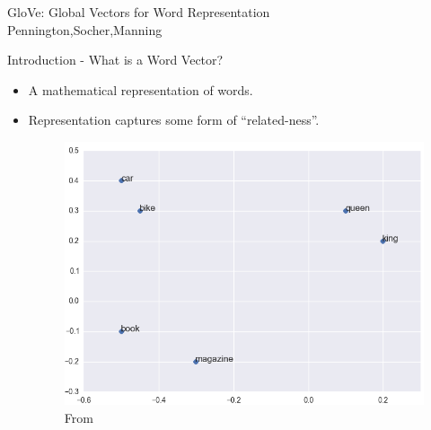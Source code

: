 \begin{frame}
  \begin{center}
    {
      \huge GloVe: Global Vectors for Word Representation
    } \\
    Pennington,Socher,Manning
  \end{center}
\end{frame}

\begin{frame}{Introduction - What is a Word Vector?}
  \begin{itemize}
  \item A mathematical representation of words.
  \item Representation captures some form of ``related-ness''.
    \begin{figure}
      \includegraphics[scale=0.35]{images/wordvec.png}
      \caption{From}
    \end{figure}    
  \end{itemize}
\end{frame}


